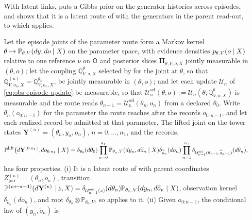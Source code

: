 With latent links,  puts a Gibbs prior on the generator histories across
episodes, and  shows that it is a latent route of
 with the generators in the parent read-out, to which
 applies.

Let the episode joints of the parameter route form a Markov kernel
$\theta\mapsto\mathbb P_{\theta,V}(dy,do\mid X)$ on the parameter space, with
evidence densities $p_{\theta,V}(o\mid X)$ relative to one reference $\nu$ on
$\mathsf O$ and posterior slices $\boldsymbol\Pi_{\theta,V,o,X}$ jointly measurable in
$(\theta,o)$; let the coupling $\mathbb Q^{\theta}_{V,o,X}$ selected by
 for the joint at $\theta$, so that
$\mathbb Q^{(n)}_{V,o_n,X}=\mathbb Q^{\theta_n}_{V,o_n,X}$, be jointly measurable in
$(\theta,o)$; and let each update $\mathcal U_n$ of
\eqref{eq:obs-episode-update} be measurable, so that
$\mathcal U^{\mathrm{sel}}_n(\theta,o):=\mathcal U_n(\theta,\mathbb Q^{\theta}_{V,o,X})$
is measurable and the route reads $\theta_{n+1}=\mathcal U^{\mathrm{sel}}_n(\theta_n,o_n)$
from a declared $\theta_0$. Write $\theta_n(o_{0:n-1})$ for the parameter the route
reaches after the records $o_{0:n-1}$, and let each realized record be admitted at
that parameter. The lifted joint on the tower states
$\mathbf Y^{(n)}=(\theta_n,y_n,\widetilde o_n)$, $n=0,\ldots,n_1$, and the records,
\begin{equation}
\mathbb P^{\mathrm{lift}}\bigl(d\mathbf Y^{(0:n_1)},do_{0:n_1}\mid X\bigr)
=\delta_{\theta_0}(d\theta_0)
\prod_{n=0}^{n_1}\mathbb P_{\theta_n,V}(dy_n,d\widetilde o_n\mid X)\delta_{\widetilde o_n}(do_n)
\prod_{n=1}^{n_1}\delta_{\mathcal U^{\mathrm{sel}}_{n-1}(\theta_{n-1},\widetilde o_{n-1})}(d\theta_n),
\label{eq:full-graph-lifted-joint}
\end{equation}
has four properties. (i) It is a latent route of 
with parent coordinates $Z^{(n)}_{\mathrm{par}}=(\theta_n,\widetilde o_n)$, transition
$\mathbb P^{(n\leftarrow n-1)}(d\mathbf Y^{(n)}\mid z,X)
=\delta_{\mathcal U^{\mathrm{sel}}_{n-1}(z)}(d\theta_n)\mathbb P_{\theta_n,V}(dy_n,d\widetilde o_n\mid X)$,
observation kernel $\delta_{\widetilde o_n}(do_n)$, and root
$\delta_{\theta_0}\otimes\mathbb P_{\theta_0,V}$, so 
applies to it. (ii) Given $o_{0:n-1}$, the conditional law of $(y_n,\widetilde o_n)$ is
